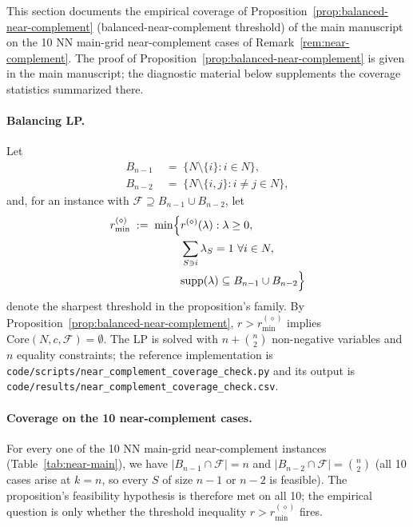 \documentclass[11pt]{article}
\theoremstyle{plain}
\theoremstyle{definition}
\theoremstyle{remark}
\begin{document}
This section documents the empirical coverage of Proposition~\ref{prop:balanced-near-complement} (balanced-near-complement threshold) of the main manuscript on the 10 NN main-grid near-complement cases of Remark~\ref{rem:near-complement}. The proof of Proposition~\ref{prop:balanced-near-complement} is given in the main manuscript; the diagnostic material below supplements the coverage statistics summarized there.

\paragraph{Balancing LP.} Let
\[
\begin{aligned}
  B_{n-1} & \;=\;\{N\setminus\{i\}: i\in N\}, \\
  B_{n-2} & \;=\;\{N\setminus\{i,j\}: i\neq j\in N\},
\end{aligned}
\]
and, for an instance with $\mathcal{F}\supseteq B_{n-1}\cup B_{n-2}$, let
\[
\begin{aligned}
  r^{(\diamond)}_{\min}\;:=\;\min\Bigl\{ {} & r^{(\diamond)}(\lambda) : \lambda\ge 0, \\
  & \sum_{S\ni i}\lambda_S=1\ \forall i\in N, \\
  & \mathrm{supp}(\lambda)\subseteq B_{n-1}\cup B_{n-2}\Bigr\}
\end{aligned}
\]
denote the sharpest threshold in the proposition's family. By Proposition~\ref{prop:balanced-near-complement}, $r>r^{(\diamond)}_{\min}$ implies $\mathrm{Core}(N,c,\mathcal{F})=\emptyset$. The LP is solved with $n+\binom{n}{2}$ non-negative variables and $n$ equality constraints; the reference implementation is \verb|code/scripts/near_complement_coverage_check.py| and its output is \verb|code/results/near_complement_coverage_check.csv|.

\paragraph{Coverage on the 10 near-complement cases.} For every one of the 10 NN main-grid near-complement instances (Table~\ref{tab:near-main}), we have $|B_{n-1}\cap\mathcal{F}|=n$ and $|B_{n-2}\cap\mathcal{F}|=\binom{n}{2}$ (all 10 cases arise at $k=n$, so every $S$ of size $n-1$ or $n-2$ is feasible). The proposition's feasibility hypothesis is therefore met on all 10; the empirical question is only whether the threshold inequality $r>r^{(\diamond)}_{\min}$ fires.
\end{document}
